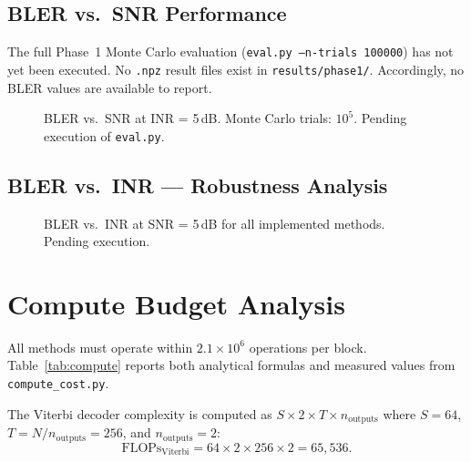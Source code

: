 \documentclass[11pt,a4paper]{article}
\begin{document}
\subsection{BLER vs.\ SNR Performance}

The full Phase~1 Monte Carlo evaluation (\texttt{eval.py --n-trials 100000}) has not yet been executed. No \texttt{.npz} result files exist in \texttt{results/phase1/}. Accordingly, no BLER values are available to report.

\begin{figure}[h]
\centering
{}
\caption{BLER vs.\ SNR at INR = 5\,dB. Monte Carlo trials: $10^5$. Pending execution of \texttt{eval.py}.}
\label{fig:bler_snr}
\end{figure}

\subsection{BLER vs.\ INR --- Robustness Analysis}

\begin{figure}[h]
\centering
{}
\caption{BLER vs.\ INR at SNR = 5\,dB for all implemented methods. Pending execution.}
\label{fig:bler_inr}
\end{figure}

\section{Compute Budget Analysis}

All methods must operate within $2.1 \times 10^6$ operations per block. Table~\ref{tab:compute} reports both analytical formulas and measured values from \texttt{compute\_cost.py}.

The Viterbi decoder complexity is computed as $S \times 2 \times T \times n_{\text{outputs}}$ where $S = 64$, $T = N/n_{\text{outputs}} = 256$, and $n_{\text{outputs}} = 2$:
\begin{equation}
  \text{FLOPs}_{\text{Viterbi}} = 64 \times 2 \times 256 \times 2 = 65{,}536.
\end{equation}
\end{document}
